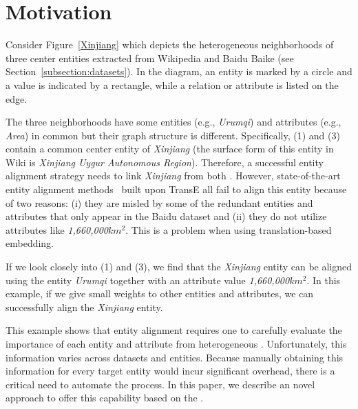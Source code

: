 \section{Motivation\label{sec:motivation}}
Consider Figure~\ref{Xinjiang} which depicts the heterogeneous neighborhoods of three center entities extracted from Wikipedia and Baidu
Baike (see Section~\ref{subsection:datasets}). In the diagram, an entity is marked by a circle and a value is indicated by a rectangle,
while a relation or attribute is listed on the edge.


The three neighborhoods have some entities (e.g., \emph{Urumqi}) and attributes (e.g., \emph{Area}) in common but their graph structure is
different. Specifically, \KGs (1) and (3) contain a common center entity of \emph{Xinjiang} (the surface form of this entity in Wiki is
\emph{Xinjiang Uygur Autonomous Region}). Therefore, a successful entity alignment strategy needs to link \emph{Xinjiang} from both \KGs.
However, state-of-the-art entity alignment methods~\cite{hao2016joint,chen2016multilingual,sun2017cross,zhu2017iterative} built upon TransE
all fail to align this entity because of two reasons: (i) they are misled by some of the redundant entities and attributes that only appear
in the Baidu dataset and (ii) they do not utilize attributes like \emph{1,660,000$km^2$}. This is a problem when using translation-based
embedding.

If we look closely into \KGs (1) and (3), we find that the \emph{Xinjiang} entity can be aligned using the entity \emph{Urumqi} together
with an attribute value \emph{1,660,000$km^2$}. In this example, if we give small weights to other entities and attributes, we can
successfully align the \emph{Xinjiang} entity.

This example shows that entity alignment requires one to carefully evaluate the importance of each entity and attribute from heterogeneous
\KGs. Unfortunately, this information varies across datasets and entities. Because manually obtaining this information for every target
entity would incur significant overhead, there is a critical need to automate the process. In this paper, we describe an novel approach to
offer this capability based on the \RGCN.
